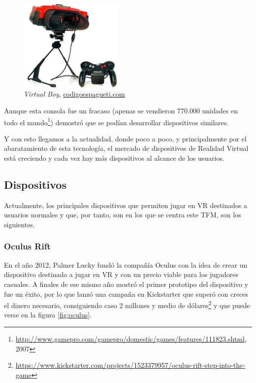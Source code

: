 \begin{figure}[H]
    \begin{center}
        \includegraphics[width=0.45\textwidth]{imagenes/2/virtual-boy.jpg}
        \caption{\textit{Virtual Boy}, \url{codigoespagueti.com}}
        \label{fig:virtual-boy}
    \end{center}
\end{figure}

Aunque esta consola fue un fracaso (apenas se vendieron 770.000 unidades en todo el mundo\footnote{\url{http://www.gamepro.com/gamepro/domestic/games/features/111823.shtml}, 2007}) demostró que se podían desarrollar dispositivos similares.

Y con esto llegamos a la actualidad, donde poco a poco, y principalmente por el abaratamiento de esta tecnología, el mercado de dispositivos de Realidad Virtual está creciendo y cada vez hay más dispositivos al alcance de los usuarios.

\subsection{Dispositivos}

Actualmente, los principales dispositivos que permiten jugar en \acs{VR} destinados a usuarios normales y que, por tanto, son en los que se centra este \acs{TFM}, son los siguientes.

\subsubsection{Oculus Rift} 

En el año 2012, Palmer Lucky fundó la compañía Oculus con la idea de crear un dispositivo destinado a jugar en \acs{VR} y con un precio viable para los jugadores casuales. A finales de ese mismo año mostró el primer prototipo del dispositivo y fue un éxito, por lo que lanzó una campaña en Kickstarter que superó con creces el dinero necesario, consiguiendo caso 2 millones y medio de dólares\footnote{\url{https://www.kickstarter.com/projects/1523379957/oculus-rift-step-into-the-game}} y que puede verse en la figura \ref{fig:oculus}.
    
